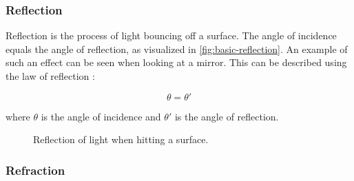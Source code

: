 \subsubsection{Reflection}

Reflection is the process of light bouncing off a surface. The angle of incidence equals the angle of reflection, as visualized in \autoref{fig:basic-reflection}. An example of such an effect can be seen when looking at a mirror. This can be described using the law of reflection \cite{fowles1989introduction}:

\begin{equation}
  \label{eqn:law-of-reflection}
  \theta = \theta'
\end{equation}

where $\theta$ is the angle of incidence and $\theta'$ is the angle of reflection.

\begin{figure}[H]
  \centering
  \caption{Reflection of light when hitting a surface.}
  \label{fig:basic-reflection}
\end{figure}

\subsubsection{Refraction}

